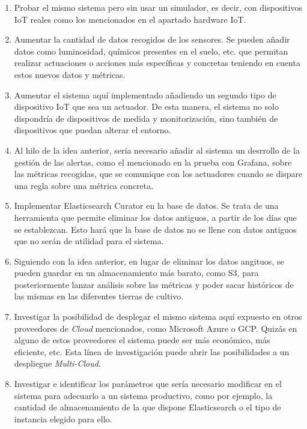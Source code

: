 \documentclass[../../memoria.tex]{subfiles}
\begin{document}
\begin{enumerate}
    \item Probar el mismo sistema pero sin usar un simulador, es decir, con dispositivos IoT reales como los mencionados en el apartado hardware IoT.

    \item Aumentar la cantidad de datos recogidos de los sensores. Se pueden añadir datos como luminosidad, químicos presentes en el suelo, etc. que permitan realizar actuaciones o acciones más específicas y concretas teniendo en cuenta estos nuevos datos y métricas.

    \item Aumentar el sistema aquí implementado añadiendo un segundo tipo de dispositivo IoT que sea un actuador. De esta manera, el sistema no solo dispondría de dispositivos de medida y monitorización, sino también de dispositivos que puedan alterar el entorno.

    \item Al hilo de la idea anterior, sería necesario añadir al sistema un desrrollo de la gestión de las alertas, como el mencionado en la prueba con Grafana, sobre las métricas recogidas, que se comunique con los actuadores cuando se dispare una regla sobre una métrica concreta.

    \item Implementar Elasticsearch Curator \cite{elasticsearchcurator} en la base de datos. Se trata de una herramienta que permite eliminar los datos antiguos, a partir de los días que se establezcan. Esto hará que la base de datos no se llene con datos antiguos que no serán de utilidad para el sistema.

    \item Siguiendo con la idea anterior, en lugar de eliminar los datos angituos, se pueden guardar en un almacenamiento más barato, como S3, para posteriormente lanzar análisis sobre las métricas y poder sacar históricos de las mismas en las diferentes tierras de cultivo.

    \item Investigar la posibilidad de desplegar el mismo sistema aquí expuesto en otros proveedores de \textit{Cloud} mencionados, como Microsoft Azure o GCP. Quizás en alguno de estos proveedores el sistema puede ser más económico, más eficiente, etc. Esta línea de investigación puede abrir las posibilidades a un despliegue \textit{Multi-Cloud}.

    \item Investigar e identificar los parámetros que sería necesario modificar en el sistema para adecuarlo a un sistema productivo, como por ejemplo, la cantidad de almacenamiento de la que dispone Elasticsearch o el tipo de instancia elegido para ello.
\end{enumerate}
\end{document}
